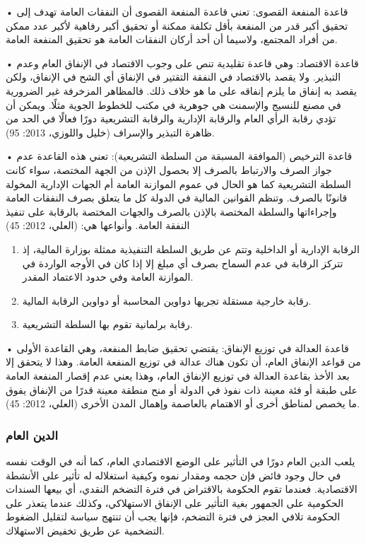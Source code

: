 \documentclass[10pt,a4paper]{report}
\begin{document}
\begin{doublespacing}
• قاعدة المنفعة القصوى:
تعني قاعدة المنفعة القصوى أن النفقات العامة تهدف إلى تحقيق أكبر قدر من المنفعة بأقل تكلفة ممكنة أو تحقيق أكبر رفاهية لأكبر عدد ممكن من أفراد المجتمع، ولاسيما أن أحد أركان النفقات العامة هو تحقيق المنفعة العامة.

• قاعدة الاقتصاد:
وهي قاعدة تقليدية تنص على وجوب الاقتصاد في الإنفاق العام وعدم التبذير. ولا يقصد بالاقتصاد في النفقة التقتير في الإنفاق أي الشح في الإنفاق، ولكن يقصد به إنفاق ما يلزم إنفاقه على ما هو خلاف ذلك. فالمظاهر المزخرفة غير الضرورية في مصنع للنسيج والإسمنت هي جوهرية في مكتب للخطوط الجوية مثلًا. ويمكن أن تؤدي رقابة الرأي العام والرقابة الإدارية والرقابة التشريعية دورًا فعالًا في الحد من ظاهرة التبذير والإسراف (خليل واللوزي، 2013: 95).

• قاعدة الترخيص (الموافقة المسبقة من السلطة التشريعية):
تعني هذه القاعدة عدم جواز الصرف والارتباط بالصرف إلا بحصول الإذن من الجهة المختصة، سواء كانت السلطة التشريعية كما هو الحال في عموم الموازنة العامة أم الجهات الإدارية المخولة قانونًا بالصرف. وتنظم القوانين المالية في الدولة كل ما يتعلق بصرف النفقات العامة وإجراءاتها والسلطة المختصة بالإذن بالصرف والجهات المختصة بالرقابة على تنفيذ النفقة العامة. وأنواعها هي: (العلي، 2012: 45)
\begin{enumerate}
	\item الرقابة الإدارية أو الداخلية وتتم عن طريق السلطة التنفيذية ممثلة بوزارة المالية، إذ تتركز الرقابة في عدم السماح بصرف أي مبلغ إلا إذا كان في الأوجه الواردة في الموازنة العامة وفي حدود الاعتماد المقدر.
	\item رقابة خارجية مستقلة تجريها دواوين المحاسبة أو دواوين الرقابة المالية.
	\item رقابة برلمانية تقوم بها السلطة التشريعية.
\end{enumerate}

• قاعدة العدالة في توزيع الإنفاق:
يقتضي تحقيق ضابط المنفعة، وهي القاعدة الأولى من قواعد الإنفاق العام، أن تكون هناك عدالة في توزيع المنفعة العامة. وهذا لا يتحقق إلا بعد الأخذ بقاعدة العدالة في توزيع الإنفاق العام، وهذا يعني عدم إقصار المنفعة العامة على طبقة أو فئة معينة ذات نفوذ في الدولة أو منح منطقة معينة قدرًا من الإنفاق يفوق ما يخصص لمناطق أخرى أو الاهتمام بالعاصمة وإهمال المدن الأخرى (العلي، 2012: 45).
\subsubsection{الدين العام}
يلعب الدين العام دورًا في التأثير على الوضع الاقتصادي العام، كما أنه في الوقت نفسه في حال وجود فائض فإن حجمه ومقدار نموه وكيفية استغلاله له تأثير على الأنشطة الاقتصادية. فعندما تقوم الحكومة بالاقتراض في فترة التضخم النقدي، أي بيعها السندات الحكومية على الجمهور بغية التأثير على الإنفاق الاستهلاكي، وكذلك عندما يتعذر على الحكومة تلافي العجز في فترة التضخم، فإنها يجب أن تنتهج سياسة لتقليل الضغوط التضخمية عن طريق تخفيض الاستهلاك. 


\end{doublespacing}
\end{document}
